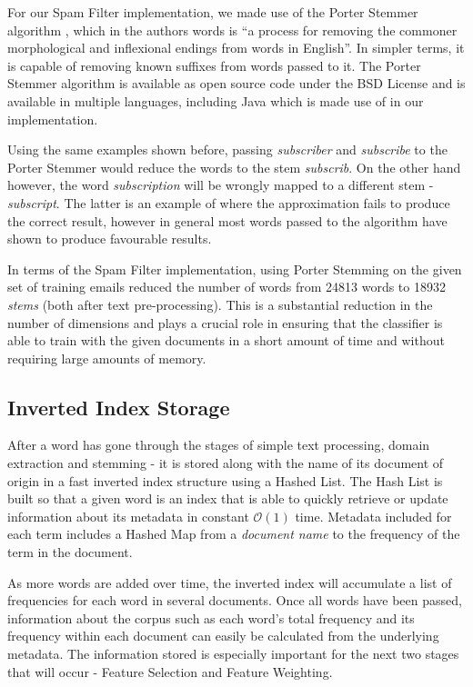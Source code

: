 For our Spam Filter implementation, we made use of the Porter Stemmer algorithm \cite{porter1980}, which in the authors words is ``a process for removing the commoner morphological and inflexional endings from words in English''. In simpler terms, it is capable of removing known suffixes from words passed to it. The Porter Stemmer algorithm is available as open source code under the BSD License and is available in multiple languages, including Java which is made use of in our implementation.

Using the same examples shown before, passing \emph{subscriber} and \emph{subscribe} to the Porter Stemmer would reduce the words to the stem \emph{subscrib}. On the other hand however, the word \emph{subscription} will be wrongly mapped to a different stem - \emph{subscript}. The latter is an example of where the approximation fails to produce the correct result, however in general most words passed to the algorithm have shown to produce favourable results.

In terms of the Spam Filter implementation, using Porter Stemming on the given set of training emails reduced the number of words from 24813 words to 18932 \textit{stems} (both after text pre-processing). This is a substantial reduction in the number of dimensions and plays a crucial role in ensuring that the classifier is able to train with the given documents in a short amount of time and without requiring large amounts of memory.

\subsection{Inverted Index Storage}

After a word has gone through the stages of simple text processing, domain extraction and stemming - it is stored along with the name of its document of origin in a fast inverted index structure using a Hashed List. The Hash List is built so that a given word is an index that is able to quickly retrieve or update information about its metadata in constant $\mathcal O(1)$ time. Metadata included for each term includes a Hashed Map from a \textit{document name} to the frequency of the term in the document.

As more words are added over time, the inverted index will accumulate a list of frequencies for each word in several documents. Once all words have been passed, information about the corpus such as each word's total frequency and its frequency within each document can easily be calculated from the underlying metadata. The information stored is especially important for the next two stages that will occur - Feature Selection and Feature Weighting.

